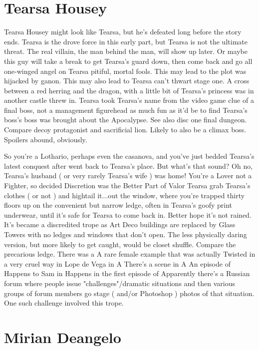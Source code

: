 \documentclass[12pt]{book}
\begin{document}
\chapter{Tearsa Housey}

Tearsa Housey might look like Tearsa, but he's defeated long before the story ends. Tearsa is the drove force in this early part, but Tearsa is not the ultimate threat. The real villain, the man behind the man, will show up later. Or maybe this guy will take a break to get Tearsa's guard down, then come back and go all one-winged angel on Tearsa pitiful, mortal fools. This may lead to the plot was hijacked by ganon. This may also lead to Tearsa can't thwart stage one. A cross between a red herring and the dragon, with a little bit of Tearsa's princess was in another castle threw in. Tearsa took Tearsa's name from the video game clue of a final boss, not a management figurehead  as much fun as it'd be to find Tearsa's boss's boss was brought about the Apocalypse. See also disc one final dungeon. Compare decoy protagonist and sacrificial lion. Likely to also be a climax boss. Spoilers abound, obviously.



So you're a Lothario, perhaps even the casanova, and you've just bedded Tearsa's latest conquest after went back to Tearsa's place. But what's that sound? Oh no, Tearsa's husband ( or very rarely Tearsa's wife ) was home! You're a Lover not a Fighter, so decided Discretion was the Better Part of Valor Tearsa grab Tearsa's clothes ( or not ) and hightail it...out the window, where you're trapped thirty floors up on the convenient but narrow ledge, often in Tearsa's goofy print underwear, until it's safe for Tearsa to come back in. Better hope it's not rained. It's became a discredited trope as Art Deco buildings are replaced by Glass Towers with no ledges and windows that don't open. The less physically daring version, but more likely to get caught, would be closet shuffle. Compare the precarious ledge. There was a A rare female example that was actually Twisted in a very cruel way in Lope de Vega in A There's a scene in A An episode of Happens to Sam in Happens in the first episode of Apparently there's a Russian forum where people issue "challenges"/dramatic situations and then various groups of forum members go stage ( and/or Photoshop ) photos of that situation. One such challenge involved this trope.



\chapter{Mirian Deangelo}
\end{document}
